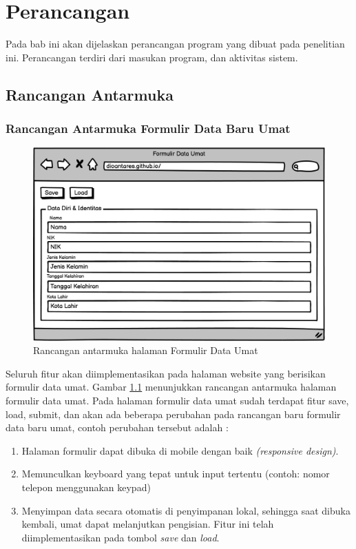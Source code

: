 \chapter{Perancangan}
\label{chap:perancangan}

Pada bab ini akan dijelaskan perancangan program yang dibuat pada penelitian ini. Perancangan terdiri dari masukan program, dan aktivitas sistem.

\section{Rancangan Antarmuka}
\label{sec:rancanganAntarmuka}

\subsection{Rancangan Antarmuka Formulir Data Baru Umat}
\label{sec:subRancanganAntarmuka}

\begin{figure}[H]
	\centering
	\includegraphics[scale=0.6]{Gambar/mockUpWebsite.png}
	\caption{Rancangan antarmuka halaman Formulir Data Umat} 
	\label{fig:formDataUmat}
\end{figure}

Seluruh fitur akan diimplementasikan pada halaman website yang berisikan formulir data umat. Gambar \ref{fig:formDataUmat} menunjukkan rancangan antarmuka halaman formulir data umat. Pada halaman formulir data umat sudah terdapat fitur save, load, submit, dan akan ada  beberapa perubahan pada rancangan baru formulir data baru umat, contoh perubahan tersebut adalah : 

\begin{enumerate}
	\item Halaman formulir dapat dibuka di mobile dengan baik \textit{(responsive design)}.
	\item Memunculkan keyboard yang tepat untuk input tertentu (contoh: nomor telepon menggunakan keypad)
	\item Menyimpan data secara otomatis di penyimpanan lokal, sehingga saat dibuka kembali, umat dapat melanjutkan pengisian. Fitur ini telah diimplementasikan pada tombol \textit{save} dan \textit{load}.
\end{enumerate}

